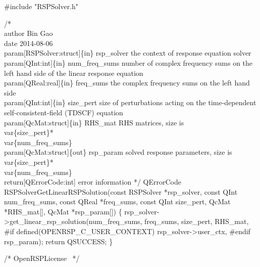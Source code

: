 #include "RSPSolver.h"

/*%
    \\author Bin Gao
    \\date 2014-08-06
    \\param[RSPSolver:struct]\{in\} rsp_solver the context of response equation solver
    \\param[QInt:int]\{in\} num_freq_sums number of complex frequency sums
        on the left hand side of the linear response equation
    \\param[QReal:real]\{in\} freq_sums the complex frequency sums on the left hand side
    \\param[QInt:int]\{in\} size_pert size of perturbations acting on the
        time-dependent self-consistent-field (TDSCF) equation
    \\param[QcMat:struct]\{in\} RHS_mat RHS matrices, size is \\var\{size_pert\}*\\var\{num_freq_sums\}
    \\param[QcMat:struct]\{out\} rsp_param solved response parameters,
        size is \\var\{size_pert\}*\\var\{num_freq_sums\}
    \\return[QErrorCode:int] error information
*/
QErrorCode RSPSolverGetLinearRSPSolution(const RSPSolver *rsp_solver,
                                         const QInt num_freq_sums,
                                         const QReal *freq_sums,
                                         const QInt size_pert,
                                         QcMat *RHS_mat[],
                                         QcMat *rsp_param[])
\{
    rsp_solver->get_linear_rsp_solution(num_freq_sums,
                                        freq_sums,
                                        size_pert,
                                        RHS_mat,
#if defined(OPENRSP_C_USER_CONTEXT)
                                        rsp_solver->user_ctx,
#endif
                                        rsp_param);
    return QSUCCESS;
\}

\nwendcode{}\endmoddef
/*
  \LA{}OpenRSPLicense~{\nwtagstyle{}}\RA{}
*/

